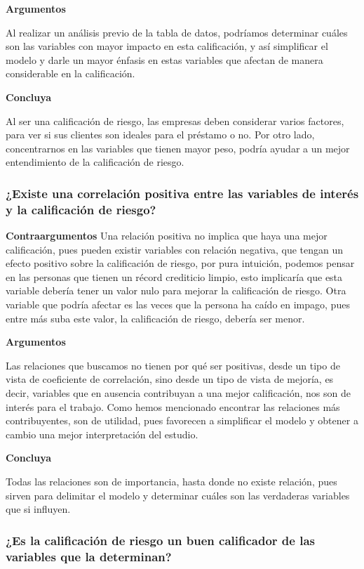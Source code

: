 \documentclass[
  letterpaper,
  DIV=11,
  numbers=noendperiod]{scrreprt}
\begin{document}
\textbf{Argumentos}

Al realizar un análisis previo de la tabla de datos, podríamos
determinar cuáles son las variables con mayor impacto en esta
calificación, y así simplificar el modelo y darle un mayor énfasis en
estas variables que afectan de manera considerable en la calificación.

\textbf{Concluya}

Al ser una calificación de riesgo, las empresas deben considerar varios
factores, para ver si sus clientes son ideales para el préstamo o no.
Por otro lado, concentrarnos en las variables que tienen mayor peso,
podría ayudar a un mejor entendimiento de la calificación de riesgo.

\subsubsection{¿Existe una correlación positiva entre las variables de
interés y la calificación de
riesgo?}\label{existe-una-correlaciuxf3n-positiva-entre-las-variables-de-interuxe9s-y-la-calificaciuxf3n-de-riesgo}

\textbf{Contraargumentos} Una relación positiva no implica que haya una
mejor calificación, pues pueden existir variables con relación negativa,
que tengan un efecto positivo sobre la calificación de riesgo, por pura
intuición, podemos pensar en las personas que tienen un récord
crediticio limpio, esto implicaría que esta variable debería tener un
valor nulo para mejorar la calificación de riesgo. Otra variable que
podría afectar es las veces que la persona ha caído en impago, pues
entre más suba este valor, la calificación de riesgo, debería ser menor.

\textbf{Argumentos}

Las relaciones que buscamos no tienen por qué ser positivas, desde un
tipo de vista de coeficiente de correlación, sino desde un tipo de vista
de mejoría, es decir, variables que en ausencia contribuyan a una mejor
calificación, nos son de interés para el trabajo. Como hemos mencionado
encontrar las relaciones más contribuyentes, son de utilidad, pues
favorecen a simplificar el modelo y obtener a cambio una mejor
interpretación del estudio.

\textbf{Concluya}

Todas las relaciones son de importancia, hasta donde no existe relación,
pues sirven para delimitar el modelo y determinar cuáles son las
verdaderas variables que si influyen.

\subsubsection{\texorpdfstring{\textbf{¿Es la calificación de riesgo un
buen calificador de las variables que la
determinan?}}{¿Es la calificación de riesgo un buen calificador de las variables que la determinan?}}\label{es-la-calificaciuxf3n-de-riesgo-un-buen-calificador-de-las-variables-que-la-determinan}
\end{document}
